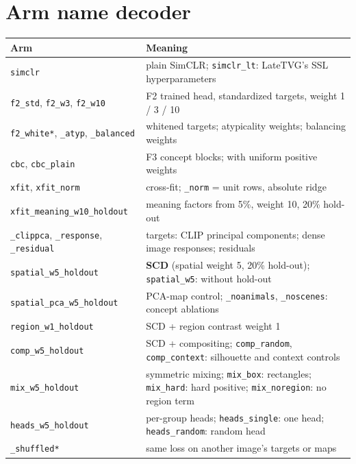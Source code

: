 \documentclass[11pt]{article}
\newcommand{\arm}[1]{\texttt{\small #1}}
\begin{document}
\section{Arm name decoder}
\begin{table}[H]
\centering
\small
\begin{tabularx}{\linewidth}{l X}
\toprule
Arm & Meaning \\
\midrule
\arm{simclr} & plain SimCLR; \arm{simclr\_lt}: LateTVG's SSL hyperparameters \\
\arm{f2\_std}, \arm{f2\_w3}, \arm{f2\_w10} & F2 trained head, standardized targets, weight 1 / 3 / 10 \\
\arm{f2\_white*}, \arm{*\_atyp}, \arm{*\_balanced} & whitened targets; atypicality weights; balancing weights \\
\arm{cbc}, \arm{cbc\_plain} & F3 concept blocks; with uniform positive weights \\
\arm{xfit}, \arm{xfit\_norm} & cross-fit; \arm{\_norm} = unit rows, absolute ridge \\
\arm{xfit\_meaning\_w10\_holdout} & meaning factors from 5\%, weight 10, 20\% hold-out \\
\arm{*\_clippca}, \arm{*\_response}, \arm{*\_residual} & targets: CLIP principal components; dense image responses; residuals \\
\arm{spatial\_w5\_holdout} & \textbf{SCD} (spatial weight 5, 20\% hold-out); \arm{spatial\_w5}: without hold-out \\
\arm{spatial\_pca\_w5\_holdout} & PCA-map control; \arm{\_noanimals}, \arm{\_noscenes}: concept ablations \\
\arm{region\_w1\_holdout} & SCD + region contrast weight 1 \\
\arm{comp\_w5\_holdout} & SCD + compositing; \arm{comp\_random}, \arm{comp\_context}: silhouette and context controls \\
\arm{mix\_w5\_holdout} & symmetric mixing; \arm{mix\_box}: rectangles; \arm{mix\_hard}: hard positive; \arm{mix\_noregion}: no region term \\
\arm{heads\_w5\_holdout} & per-group heads; \arm{heads\_single}: one head; \arm{heads\_random}: random head \\
\arm{*\_shuffled*} & same loss on another image's targets or maps \\
\bottomrule
\end{tabularx}
\end{table}
\end{document}
